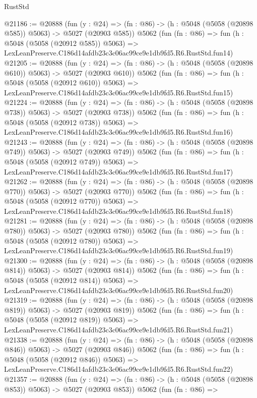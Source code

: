 \begin{lexlean}{RustStd}
\begin{coremodule}
@21186 := @20888
    (fun (y : @24) => (fn : @86) -> (h : @5048 (@5058 (@20898 @585)) @5063) -> @5027 (@20903 @585))
    @5062
    (fun (fn : @86) =>
    fun (h : @5048 (@5058 (@20912 @585)) @5063) =>
    LexLeanPreserve.C186d14afdb23c3c06ac99ce9e1db9fd5.R6.RustStd.fun14)
@21205 := @20888
    (fun (y : @24) => (fn : @86) -> (h : @5048 (@5058 (@20898 @610)) @5063) -> @5027 (@20903 @610))
    @5062
    (fun (fn : @86) =>
    fun (h : @5048 (@5058 (@20912 @610)) @5063) =>
    LexLeanPreserve.C186d14afdb23c3c06ac99ce9e1db9fd5.R6.RustStd.fun15)
@21224 := @20888
    (fun (y : @24) => (fn : @86) -> (h : @5048 (@5058 (@20898 @738)) @5063) -> @5027 (@20903 @738))
    @5062
    (fun (fn : @86) =>
    fun (h : @5048 (@5058 (@20912 @738)) @5063) =>
    LexLeanPreserve.C186d14afdb23c3c06ac99ce9e1db9fd5.R6.RustStd.fun16)
@21243 := @20888
    (fun (y : @24) => (fn : @86) -> (h : @5048 (@5058 (@20898 @749)) @5063) -> @5027 (@20903 @749))
    @5062
    (fun (fn : @86) =>
    fun (h : @5048 (@5058 (@20912 @749)) @5063) =>
    LexLeanPreserve.C186d14afdb23c3c06ac99ce9e1db9fd5.R6.RustStd.fun17)
@21262 := @20888
    (fun (y : @24) => (fn : @86) -> (h : @5048 (@5058 (@20898 @770)) @5063) -> @5027 (@20903 @770))
    @5062
    (fun (fn : @86) =>
    fun (h : @5048 (@5058 (@20912 @770)) @5063) =>
    LexLeanPreserve.C186d14afdb23c3c06ac99ce9e1db9fd5.R6.RustStd.fun18)
@21281 := @20888
    (fun (y : @24) => (fn : @86) -> (h : @5048 (@5058 (@20898 @780)) @5063) -> @5027 (@20903 @780))
    @5062
    (fun (fn : @86) =>
    fun (h : @5048 (@5058 (@20912 @780)) @5063) =>
    LexLeanPreserve.C186d14afdb23c3c06ac99ce9e1db9fd5.R6.RustStd.fun19)
@21300 := @20888
    (fun (y : @24) => (fn : @86) -> (h : @5048 (@5058 (@20898 @814)) @5063) -> @5027 (@20903 @814))
    @5062
    (fun (fn : @86) =>
    fun (h : @5048 (@5058 (@20912 @814)) @5063) =>
    LexLeanPreserve.C186d14afdb23c3c06ac99ce9e1db9fd5.R6.RustStd.fun20)
@21319 := @20888
    (fun (y : @24) => (fn : @86) -> (h : @5048 (@5058 (@20898 @819)) @5063) -> @5027 (@20903 @819))
    @5062
    (fun (fn : @86) =>
    fun (h : @5048 (@5058 (@20912 @819)) @5063) =>
    LexLeanPreserve.C186d14afdb23c3c06ac99ce9e1db9fd5.R6.RustStd.fun21)
@21338 := @20888
    (fun (y : @24) => (fn : @86) -> (h : @5048 (@5058 (@20898 @846)) @5063) -> @5027 (@20903 @846))
    @5062
    (fun (fn : @86) =>
    fun (h : @5048 (@5058 (@20912 @846)) @5063) =>
    LexLeanPreserve.C186d14afdb23c3c06ac99ce9e1db9fd5.R6.RustStd.fun22)
@21357 := @20888
    (fun (y : @24) => (fn : @86) -> (h : @5048 (@5058 (@20898 @853)) @5063) -> @5027 (@20903 @853))
    @5062
    (fun (fn : @86) =>

\end{coremodule}
\end{lexlean}

